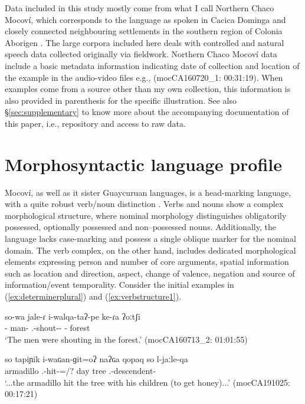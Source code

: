 \documentclass[12pt]{article}
\begin{document}
Data included in this study mostly come from what I call Northern Chaco Mocoví, which corresponds to the language as spoken in Cacica Dominga and closely connected neighbouring settlements in the southern region of Colonia Aborigen \citep[see][]{Juarez2019}. The large corpora included here deals with controlled and natural speech data collected originally via fieldwork. Northern Chaco Mocoví data include a basic metadata information indicating date of collection and location of the example in the audio-video files e.g., (mocCA160720\_1: 00:31:19). When examples come from a source other than my own collection, this information is also provided in parenthesis for the specific illustration. See also \S \ref{sec:supplementary} to know more about the accompanying documentation of this paper, i.e., repository and access to raw data. 


\section{Morphosyntactic language profile}\label{sec:morphosynstactic-overview}

Mocoví, as well as it sister Guaycuruan languages, is a head-marking language, with a quite robust verb/noun distinction \citep[see, for instance,][]{juarez2022a}. Verbs and nouns show a complex morphological structure, where nominal morphology distinguishes obligatorily possessed, optionally possessed and non--possessed nouns. Additionally, the language lacks case-marking and possess a single oblique marker for the nominal domain.  The verb complex, on the other hand, includes dedicated morphological elements expressing person and number of core arguments, spatial information such as location and direction, aspect, change of valence, negation and source of information/event temporality. Consider the initial examples in (\ref{ex:determinerplural}) and (\ref{ex:verbstructure1}). 
 
\begin{exe}
\ex 
\gll   so-wa jale-ɾ i-walqa-taʔ-pe ke-ɾa ʔoːtʃi \\ 
{\DetTwo}-{\Pl} man-{\Pl} {\Third.\II}-shout-{\Pl}-{\Prog} {\Obl}-{\DetFour} forest\\
\trans `The men were shouting in the forest.' \hfill (mocCA160713\_2: 01:01:55) \label{ex:determinerplural} 
 \end{exe}
 
 \begin{exe}
\ex 
\gll so tapiɲik i-waɢan-ɡit=oʔ naʔɢa qopaq so l-jaːle-qa   \\
{\DetTwo} armadillo {\Third.\II}-hit-{\LocThree}={\Evd/\Tprl}? day tree {\DetTwo} {\Third.\Poss}-descendent-{\Pl}    \\
	\trans `...the armadillo hit the tree with his children (to get honey)...'
\trans 	\hfill  (mocCA191025: 00:17:21)\label{ex:verbstructure1}
\end{exe}
 
\end{document}
